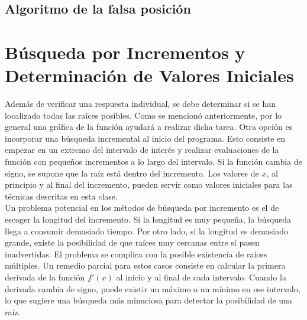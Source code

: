 \documentclass[12pt,letterpaper]{article}
\theoremstyle{definition}
\theoremstyle{plain}
\theoremstyle{remark}
\begin{document}
\subsection{Algoritmo de la falsa posición}
\begin{multicols}{2}
\begin{algorithmic}[1]
\Repeat
{}
\EndIf
{}
\Else
{}
\EndIf
{}
\EndFunction
\end{algorithmic}
\end{multicols}

\newpage

\section{Búsqueda por Incrementos y Determinación de Valores Iniciales}
Además de verificar una respuesta individual, se debe determinar si se han localizado todas las raíces posibles. Como se mencionó anteriormente, por lo general una gráfica de la función ayudará a realizar dicha tarea. Otra opción es incorporar una búsqueda incremental al inicio del programa. Esto consiste en empezar en un extremo del intervalo de interés y realizar evaluaciones de la función con pequeños incrementos a lo largo del intervalo. Si la función cambia de signo, se supone que la raíz está dentro del incremento. Los valores de $x$, al principio y al final del incremento, pueden servir como valores iniciales para las técnicas descritas en esta clase.\\

Un problema potencial en los métodos de búsqueda por incremento es el de escoger la longitud del incremento. Si la longitud es muy pequeña, la búsqueda llega a consumir demasiado tiempo. Por otro lado, si la longitud es demasiado grande, existe la posibilidad de que raíces muy cercanas entre sí pasen inadvertidas. El problema se complica con la posible existencia de raíces múltiples. Un remedio parcial para estos casos consiste en calcular la primera derivada de la función $f'(x)$ al inicio y al final de cada intervalo. Cuando la derivada cambia de signo, puede existir un máximo o un mínimo en ese intervalo, lo que sugiere una búsqueda más minuciosa para detectar la posibilidad de una raíz.\\
\end{document}
